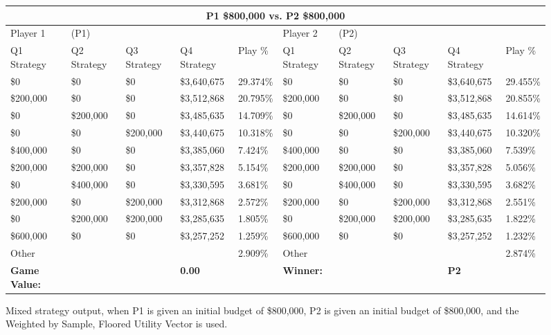 \documentclass[11pt]{article}
\begin{document}
\begin{figure}
\tiny
\begin{tabular}{ |p{1.0cm}p{1.0cm}p{1.0cm}p{2.0cm}|p{1.0cm}||p{1.0cm}p{1.0cm}p{1.0cm}p{2.0cm}|p{1.0cm}|}
\hline
\multicolumn{10}{|c|}{P1 \$800,000 vs. P2 \$800,000} \\
\hline
Player 1 & (P1) & & & & Player 2 & (P2) & & & \\
\hline
Q1 Strategy & Q2 Strategy & Q3 Strategy & Q4 Strategy  &  Play \% & Q1 Strategy & Q2 Strategy & Q3 Strategy & Q4 Strategy  &  Play \%\\
\hline
\$0 & \$0 & \$0 & \$3,640,675 & 29.374\% & \$0 & \$0 & \$0 & \$3,640,675 & 29.455\% \\
\$200,000 & \$0 & \$0 & \$3,512,868 & 20.795\% & \$200,000 & \$0 & \$0 & \$3,512,868 & 20.855\% \\
\$0 & \$200,000 & \$0 & \$3,485,635 & 14.709\% & \$0 & \$200,000 & \$0 & \$3,485,635 & 14.614\% \\
\$0 & \$0 & \$200,000 & \$3,440,675 & 10.318\% & \$0 & \$0 & \$200,000 & \$3,440,675 & 10.320\% \\
\$400,000 & \$0 & \$0 & \$3,385,060 & 7.424\% & \$400,000 & \$0 & \$0 & \$3,385,060 & 7.539\% \\
\$200,000 & \$200,000 & \$0 & \$3,357,828 & 5.154\% & \$200,000 & \$200,000 & \$0 & \$3,357,828 & 5.056\% \\
\$0 & \$400,000 & \$0 & \$3,330,595 & 3.681\% & \$0 & \$400,000 & \$0 & \$3,330,595 & 3.682\% \\
\$200,000 & \$0 & \$200,000 & \$3,312,868 & 2.572\% & \$200,000 & \$0 & \$200,000 & \$3,312,868 & 2.551\% \\
\$0 & \$200,000 & \$200,000 & \$3,285,635 & 1.805\% & \$0 & \$200,000 & \$200,000 & \$3,285,635 & 1.822\% \\
\$600,000 & \$0 & \$0 & \$3,257,252 & 1.259\% & \$600,000 & \$0 & \$0 & \$3,257,252 & 1.232\% \\
\hline
Other &&&& 2.909\% & Other &&&& 2.874\% \\
\hline
\small \textbf{Game Value:} &&& \small \textbf{0.00} && \small \textbf{Winner:} &&& \small \textbf{P2}&\\
\hline
\end{tabular}
\caption{Mixed strategy output, when P1 is given an initial budget of \$800,000, P2 is given an initial budget of \$800,000, and the Weighted by Sample, Floored Utility Vector is used.}
\label{8v8table.3}
\end{figure}
\end{document}
